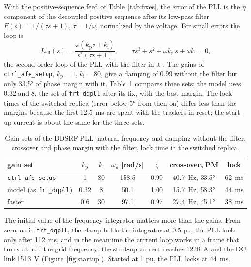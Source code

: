 \documentclass[11pt,a4paper]{scrartcl}
\newcommand{\ped}[1]{_{\mathrm{#1}}}
\newcommand{\code}[1]{\texttt{#1}}
\begin{document}
\begin{onehalfspace}
With the positive-sequence feed of Table~\ref{tab:fixes}, the error of the PLL is the $\eta$ component of the decoupled positive sequence after its low-pass filter $F(s) = 1/(\tau s + 1)$, $\tau = 1/\omega$, normalized by the voltage. For small errors the loop is
\begin{equation}
	L\ped{pll}(s) = \frac{\omega(k\ped{p} s + k\ped{i})}{s^2 (\tau s + 1)}, \qquad \tau s^3 + s^2 + \omega k\ped{p}\, s + \omega k\ped{i} = 0,
\end{equation}
the second order loop of the PLL with the filter in it \cite{note_pll3}. The gains of \code{ctrl\_afe\_setup}, $k\ped{p} = 1$, $k\ped{i} = 80$, give a damping of \num{0.99} without the filter but only \ang{33.5} of phase margin with it. Table~\ref{tab:pllgains} compares three sets; the model uses \num{0.32} and \num{8}, the set of \code{frt\_dqpll} after its fix, with the best margin. The lock times of the switched replica (error below \ang{5} from then on) differ less than the margins because the first \SI{12.5}{\milli\second} are spent with the trackers in reset; the start-up current is about the same for the three sets.

\begin{table}[H]
	\centering
	\caption{Gain sets of the DDSRF-PLL: natural frequency and damping without the filter, crossover and phase margin with the filter, lock time in the switched replica.}
	\label{tab:pllgains}
	\begin{tabular}{@{} l c c c c c c @{}}
		\toprule
		gain set & $k\ped{p}$ & $k\ped{i}$ & $\omega\ped{n}$ [rad/s] & $\zeta$ & crossover, PM & lock \\
		\midrule
		\code{ctrl\_afe\_setup} & 1 & 80 & 158.5 & 0.99 & \SI{40.7}{\hertz}, \ang{33.5} & \SI{62}{\milli\second} \\
		model (as \code{frt\_dqpll}) & 0.32 & 8 & 50.1 & 1.00 & \SI{15.7}{\hertz}, \ang{58.3} & \SI{44}{\milli\second} \\
		faster & 0.6 & 30 & 97.1 & 0.97 & \SI{27.4}{\hertz}, \ang{45.1} & \SI{38}{\milli\second} \\
		\bottomrule
	\end{tabular}
\end{table}

The initial value of the frequency integrator matters more than the gains. From zero, as in \code{frt\_dqpll}, the clamp holds the integrator at \num{0.5} pu, the PLL locks only after \SI{112}{\milli\second}, and in the meantime the current loop works in a frame that turns at half the grid frequency: the start-up current reaches \SI{1228}{\ampere} and the DC link \SI{1513}{\volt} (Figure~\ref{fig:startup}). Started at \num{1} pu, the PLL locks at \SI{44}{\milli\second}.


\end{onehalfspace}
\end{document}
